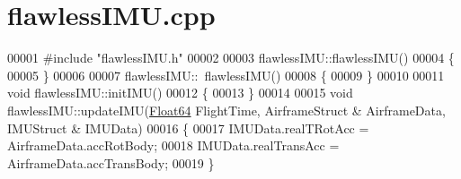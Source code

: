 \hypertarget{flawless_i_m_u_8cpp_source}{}\section{flawless\+I\+M\+U.\+cpp}
\label{flawless_i_m_u_8cpp_source}

\begin{DoxyCode}
00001 \textcolor{preprocessor}{#include "flawlessIMU.h"}
00002 
00003 flawlessIMU::flawlessIMU()
00004 \{
00005 \}
00006 
00007 flawlessIMU::~flawlessIMU()
00008 \{
00009 \}
00010 
00011 \textcolor{keywordtype}{void} flawlessIMU::initIMU()
00012 \{
00013 \}
00014 
00015 \textcolor{keywordtype}{void} flawlessIMU::updateIMU(\hyperlink{group___tools_ga3f1431cb9f76da10f59246d1d743dc2c}{Float64} FlightTime, AirframeStruct & AirframeData, IMUStruct & IMUData)
00016 \{
00017     IMUData.realTRotAcc  = AirframeData.accRotBody;
00018     IMUData.realTransAcc = AirframeData.accTransBody;
00019 \}
\end{DoxyCode}
